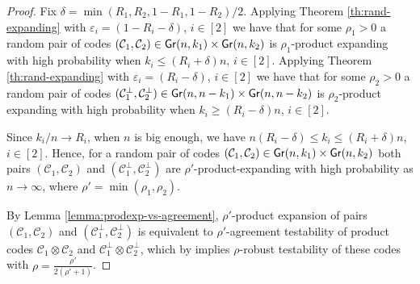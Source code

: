 \documentclass[11pt]{article}
\newcommand{\ceilbr}[1]{\left\lceil #1\right\rceil}
\let\le\leqslant
\let\ge\geqslant
\newcommand{\eps}{\varepsilon}
\theoremstyle{plain}
\newtheorem{corollary}{Corollary}
\theoremstyle{definition}
\theoremstyle{remark}
\newcommand{\cC}{\mathcal{C}}
\newcommand{\Gr}{{\sf Gr}}
\begin{document}
\CrMain*
\begin{proof}
    

    Fix $\delta=\min(R_1,R_2,1-R_1,1-R_2)/2$.
    Applying Theorem \ref{th:rand-expanding} with $\eps_i=(1-R_i-\delta)$, $i\in [2]$ we have that for some $\rho_1>0$ a random pair of codes $(\cC_1,\cC_2)\in \Gr(n,k_1)\times \Gr(n,k_2)$ is $\rho_1$-product expanding with high probability when $k_i\le (R_i+\delta)n$, $i\in [2]$.
    Applying Theorem \ref{th:rand-expanding} with $\eps_i=(R_i-\delta)$, $i\in [2]$ we have that for some $\rho_2>0$ a random pair of codes $(\cC_1^\bot,\cC_2^\bot)\in \Gr(n,n-k_1)\times \Gr(n,n-k_2)$ is $\rho_2$-product expanding with high probability when $k_i\ge (R_i-\delta)n$, $i\in [2]$.
    
    Since $k_i/n\to R_i$, when $n$ is big enough, we have $n(R_i-\delta)\le k_i\le (R_i+\delta)n$, %
    $i\in [2]$. Hence, for a random pair of codes $(\cC_1,\cC_2)\in \Gr(n,k_1)\times \Gr(n,k_2)$ both pairs $(\cC_1,\cC_2)$ and $(\cC_1^\bot,\cC_2^\bot)$ are $\rho'$-product-expanding with high probability as $n\to\infty$, %
    where $\rho'=\min(\rho_1,\rho_2)$.
    

    By Lemma \ref{lemma:prodexp-vs-agreement}, $\rho'$-product expansion of pairs $(\cC_1,\cC_2)$ and $(\cC_1^\bot,\cC_2^\bot)$ is equivalent to $\rho'$-agreement testability of product codes $\cC_1\otimes\cC_2$ and $\cC_1^\bot\otimes \cC_2^\bot$, which by \cite[Lemma 2.9]{Dinur:stoc2022} implies $\rho$-robust testability of these codes with $\rho=\frac{\rho'}{2(\rho'+1)}$.
\end{proof}
\end{document}
